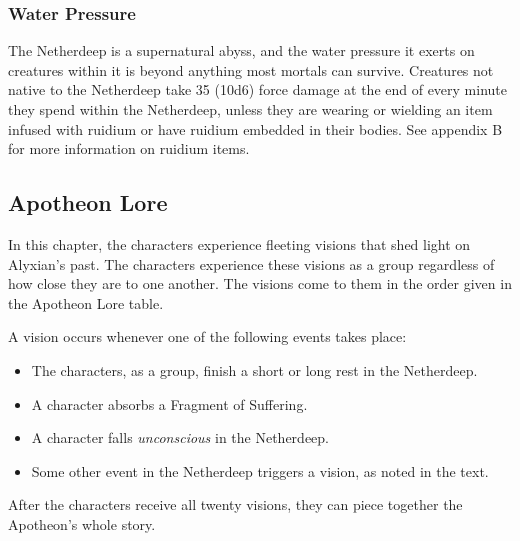 \documentclass[letterpaper, 11pt, bg=full, twocolumn]{dndbook}
\begin{document}
\subsubsection{Water Pressure}

The Netherdeep is a supernatural abyss, and the water pressure it exerts on creatures within it is beyond anything most mortals can survive. Creatures not native to the Netherdeep take 35 (10d6) force damage at the end of every minute they spend within the Netherdeep, unless they are wearing or wielding an item infused with ruidium or have ruidium embedded in their bodies. See appendix B for more information on ruidium items.

\subsection{Apotheon Lore}

In this chapter, the characters experience fleeting visions that shed light on Alyxian's past. The characters experience these visions as a group regardless of how close they are to one another. The visions come to them in the order given in the Apotheon Lore table.

A vision occurs whenever one of the following events takes place:

\begin{itemize}
\item The characters, as a group, finish a short or long rest in the Netherdeep.
\item A character absorbs a Fragment of Suffering.
\item A character falls \textit{unconscious} in the Netherdeep.
\item Some other event in the Netherdeep triggers a vision, as noted in the text.
\end{itemize}

After the characters receive all twenty visions, they can piece together the Apotheon's whole story.
\end{document}
